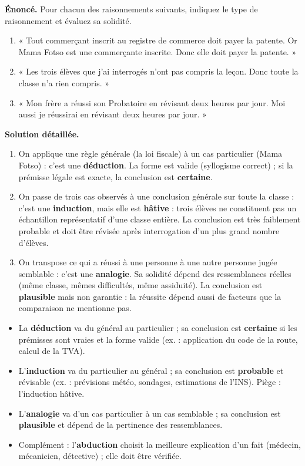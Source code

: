 \documentclass[11pt]{article}
\begin{document}
\begin{exoresolu}
\textbf{Énoncé.} Pour chacun des raisonnements suivants, indiquez le type de raisonnement et évaluez sa solidité.
\begin{enumerate}
\item « Tout commerçant inscrit au registre de commerce doit payer la patente. Or Mama Fotso est une commerçante inscrite. Donc elle doit payer la patente. »
\item « Les trois élèves que j'ai interrogés n'ont pas compris la leçon. Donc toute la classe n'a rien compris. »
\item « Mon frère a réussi son Probatoire en révisant deux heures par jour. Moi aussi je réussirai en révisant deux heures par jour. »
\end{enumerate}
\tcblower
\textbf{Solution détaillée.}
\begin{enumerate}
\item On applique une règle générale (la loi fiscale) à un cas particulier (Mama Fotso) : c'est une \textbf{déduction}. La forme est valide (syllogisme correct) ; si la prémisse légale est exacte, la conclusion est \textbf{certaine}.
\item On passe de trois cas observés à une conclusion générale sur toute la classe : c'est une \textbf{induction}, mais elle est \textbf{hâtive} : trois élèves ne constituent pas un échantillon représentatif d'une classe entière. La conclusion est très faiblement probable et doit être révisée après interrogation d'un plus grand nombre d'élèves.
\item On transpose ce qui a réussi à une personne à une autre personne jugée semblable : c'est une \textbf{analogie}. Sa solidité dépend des ressemblances réelles (même classe, mêmes difficultés, même assiduité). La conclusion est \textbf{plausible} mais non garantie : la réussite dépend aussi de facteurs que la comparaison ne mentionne pas.
\end{enumerate}
\end{exoresolu}

\begin{aretenir}
\begin{itemize}
\item La \textbf{déduction} va du général au particulier ; sa conclusion est \textbf{certaine} si les prémisses sont vraies et la forme valide (ex. : application du code de la route, calcul de la TVA).
\item L'\textbf{induction} va du particulier au général ; sa conclusion est \textbf{probable} et révisable (ex. : prévisions météo, sondages, estimations de l'INS). Piège : l'induction hâtive.
\item L'\textbf{analogie} va d'un cas particulier à un cas semblable ; sa conclusion est \textbf{plausible} et dépend de la pertinence des ressemblances.
\item Complément : l'\textbf{abduction} choisit la meilleure explication d'un fait (médecin, mécanicien, détective) ; elle doit être vérifiée.
\end{itemize}
\end{aretenir}
\end{document}
